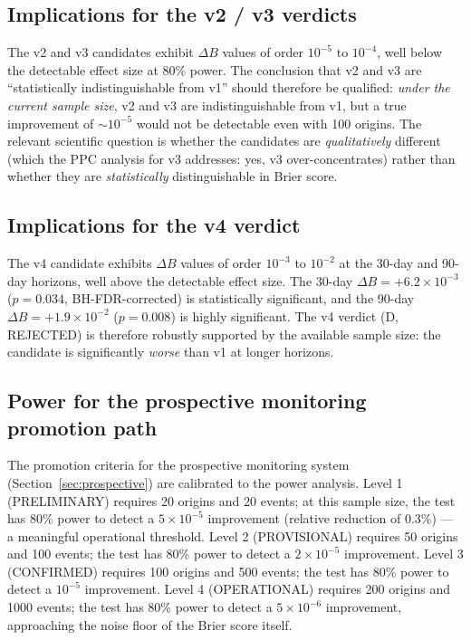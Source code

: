 \documentclass[10pt,a4paper,twocolumn]{article}
\begin{document}
\subsection{Implications for the v2 / v3 verdicts}

The v2 and v3 candidates exhibit $\Delta B$ values of order $10^{-5}$ to $10^{-4}$, well below the detectable effect size at 80\% power. The conclusion that v2 and v3 are ``statistically indistinguishable from v1'' should therefore be qualified: \emph{under the current sample size}, v2 and v3 are indistinguishable from v1, but a true improvement of $\sim 10^{-5}$ would not be detectable even with 100 origins. The relevant scientific question is whether the candidates are \emph{qualitatively} different (which the PPC analysis for v3 addresses: yes, v3 over-concentrates) rather than whether they are \emph{statistically} distinguishable in Brier score.

\subsection{Implications for the v4 verdict}

The v4 candidate exhibits $\Delta B$ values of order $10^{-3}$ to $10^{-2}$ at the 30-day and 90-day horizons, well above the detectable effect size. The 30-day $\Delta B = +6.2 \times 10^{-3}$ ($p = 0.034$, BH-FDR-corrected) is statistically significant, and the 90-day $\Delta B = +1.9 \times 10^{-2}$ ($p = 0.008$) is highly significant. The v4 verdict (D, REJECTED) is therefore robustly supported by the available sample size: the candidate is significantly \emph{worse} than v1 at longer horizons.

\subsection{Power for the prospective monitoring promotion path}

The promotion criteria for the prospective monitoring system (Section~\ref{sec:prospective}) are calibrated to the power analysis. Level 1 (PRELIMINARY) requires 20 origins and 20 events; at this sample size, the test has 80\% power to detect a $5 \times 10^{-5}$ improvement (relative reduction of 0.3\%) --- a meaningful operational threshold. Level 2 (PROVISIONAL) requires 50 origins and 100 events; the test has 80\% power to detect a $2 \times 10^{-5}$ improvement. Level 3 (CONFIRMED) requires 100 origins and 500 events; the test has 80\% power to detect a $10^{-5}$ improvement. Level 4 (OPERATIONAL) requires 200 origins and 1000 events; the test has 80\% power to detect a $5 \times 10^{-6}$ improvement, approaching the noise floor of the Brier score itself.
\end{document}
